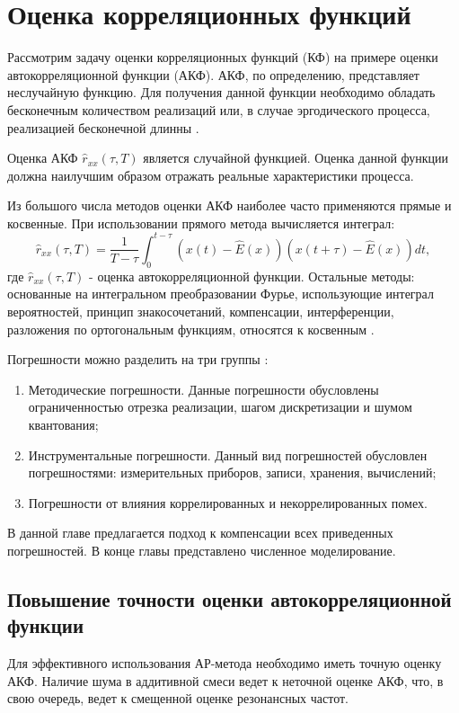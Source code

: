\chapter{Оценка корреляционных функций}
\label{l:sec_acf}

Рассмотрим задачу оценки корреляционных функций (КФ) на примере оценки автокорреляционной функции (АКФ). АКФ, по определению, представляет неслучайную функцию.
Для получения данной функции необходимо обладать бесконечным количеством реализаций или, в случае эргодического процесса, реализацией бесконечной длинны \cite{bolshakov-book}.

Оценка АКФ ${\hat{r}_{xx}(\tau, T)}$ является случайной функцией. Оценка данной функции должна наилучшим образом отражать реальные характеристики процесса.

Из большого числа методов оценки АКФ наиболее часто применяются прямые и косвенные. При использовании прямого метода вычисляется интеграл:
\begin{equation}
	\label{eq:acf_integral_basic}
	\hat{r}_{xx}(\tau, T) = \frac{1}{T-\tau} \int_{0}^{t-\tau} (x(t) - \hat{E}(x))(x(t+\tau) - \hat{E}(x))dt,
\end{equation}
где ${\hat{r}_{xx}(\tau, T)}$ -  оценка автокорреляционной функции. Остальные методы: основанные на интегральном преобразовании Фурье, использующие интеграл вероятностей, принцип
знакосочетаний, компенсации, интерференции, разложения по ортогональным функциям, относятся к косвенным \cite{bolshakov-book}.

Погрешности можно разделить на три группы \cite{bolshakov-book}:
\begin{enumerate}
	\item Методические погрешности. Данные погрешности обусловлены ограниченностью отрезка реализации, шагом дискретизации и шумом квантования;
	\item Инструментальные погрешности. Данный вид погрешностей обусловлен погрешностями: измерительных приборов, записи, хранения, вычислений;
	\item Погрешности от влияния коррелированных и некоррелированных помех.
\end{enumerate}

В данной главе предлагается подход к компенсации всех приведенных погрешностей. В конце главы представлено численное моделирование.

\section{Повышение точности оценки автокорреляционной функции}
Для эффективного использования АР-метода необходимо иметь точную оценку АКФ. Наличие шума в аддитивной смеси ведет к неточной
оценке АКФ, что, в свою очередь, ведет к смещенной оценке резонансных частот.

